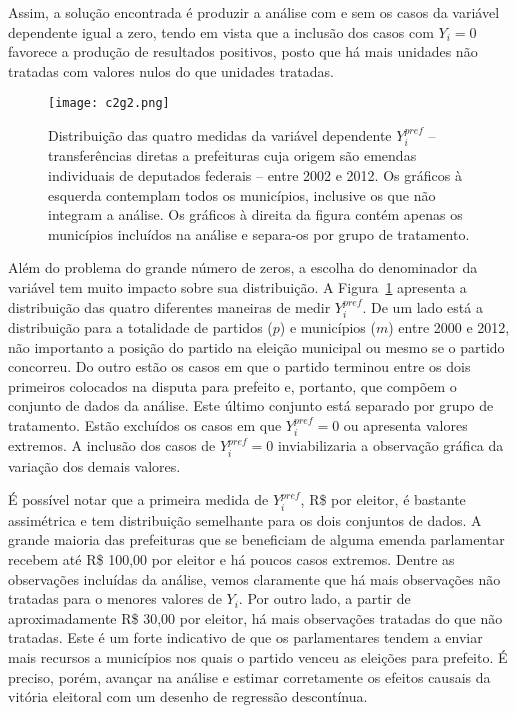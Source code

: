Assim, a solução encontrada é produzir a análise com e sem os casos da variável dependente igual a zero, tendo em vista que a inclusão  dos casos com $Y_{i}=0$ favorece a produção de resultados positivos, posto que há mais unidades não tratadas com valores nulos do que unidades tratadas.

\begin{figure}[htp]
	\centering
	\texttt{[image: c2g2.png]}
	\caption{Distribuição das quatro medidas da variável dependente $Y_{i}^{pref}$ -- transferências diretas a prefeituras cuja origem são emendas individuais de deputados federais -- entre 2002 e 2012. Os gráficos à esquerda contemplam todos os municípios, inclusive os que não integram a análise. Os gráficos à direita da figura contém apenas os municípios incluídos na análise e separa-os por grupo de tratamento.}
	\label{fig:c2g2}
\end{figure}

Além do problema do grande número de zeros, a escolha do denominador da variável tem muito impacto sobre sua distribuição. A Figura~\ref{fig:c2g2} apresenta a distribuição das quatro diferentes maneiras de medir $Y_{i}^{pref}$. De um lado está a distribuição para a totalidade de partidos ($p$) e municípios ($m$) entre 2000 e 2012, não importanto a posição do partido na eleição municipal ou mesmo se o partido concorreu. Do outro estão os casos em que o partido terminou entre os dois primeiros colocados na disputa para prefeito e, portanto, que compõem o conjunto de dados da análise. Este último conjunto está separado por grupo de tratamento. Estão excluídos os casos em que $Y_{i}^{pref}=0$ ou apresenta valores extremos. A inclusão dos casos de $Y_{i}^{pref}=0$ inviabilizaria a observação gráfica da variação dos demais valores.

É possível notar que a primeira medida de $Y_{i}^{pref}$, R\$ por eleitor, é bastante assimétrica e tem distribuição semelhante para os dois conjuntos de dados. A grande maioria das prefeituras que se beneficiam de alguma emenda parlamentar recebem até R\$ 100,00 por eleitor e há poucos casos extremos. Dentre as observações incluídas da análise, vemos claramente que há mais observações não tratadas para o menores valores de $Y_{i}$. Por outro lado, a partir de aproximadamente R\$ 30,00 por eleitor, há mais observações tratadas do que não tratadas. Este é um forte indicativo de que os parlamentares tendem a enviar mais recursos a municípios nos quais o partido venceu as eleições para prefeito. É preciso, porém, avançar na análise e estimar corretamente os efeitos causais da vitória eleitoral com um desenho de regressão descontínua.

